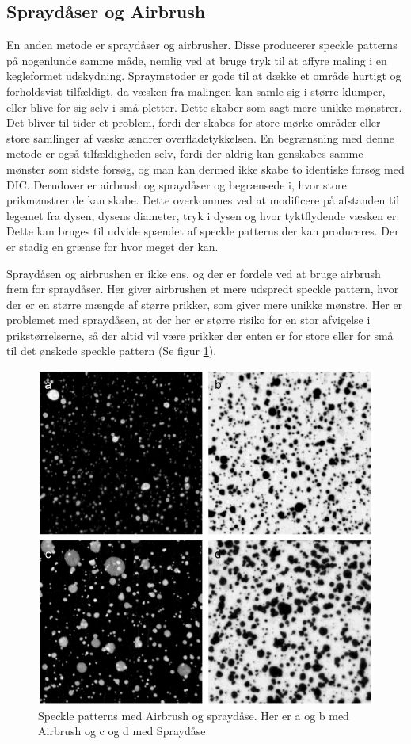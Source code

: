 \subsection{Spraydåser og Airbrush} En anden metode er spraydåser og airbrusher. Disse producerer speckle patterns på nogenlunde samme måde, nemlig ved at bruge tryk til at affyre maling i en kegleformet udskydning. Spraymetoder er gode til at dække et område hurtigt og forholdsvist tilfældigt, da væsken fra malingen kan samle sig i større klumper, eller blive for sig selv i små pletter. Dette skaber som sagt mere unikke mønstrer. Det bliver til tider et problem, fordi der skabes for store mørke områder eller store samlinger af væske ændrer overfladetykkelsen. En begrænsning med denne metode er også tilfældigheden selv, fordi der aldrig kan genskabes samme mønster som sidste forsøg, og man kan dermed ikke skabe to identiske forsøg med DIC. Derudover er airbrush og spraydåser og begrænsede i, hvor store prikmønstrer de kan skabe. Dette overkommes ved at modificere på afstanden til legemet fra dysen, dysens diameter, tryk i dysen og hvor tyktflydende væsken er. Dette kan bruges til udvide spændet af speckle patterns der kan produceres. Der er stadig en grænse for hvor meget der kan. \parencite{Dong2017ACorrelation, Quino2021SpeckleEndurance}

Spraydåsen og airbrushen er ikke ens, og der er fordele ved at bruge airbrush frem for spraydåser. Her giver airbrushen et mere udspredt speckle pattern, hvor der er en større mængde af større prikker, som giver mere unikke mønstre. Her er problemet med spraydåsen, at der her er større risiko for en stor afvigelse i prikstørrelserne, så der altid vil være prikker der enten er for store eller for små til det ønskede speckle pattern (Se figur \ref{Spraymetode}).\parencite{Crammond2013SpeckleCorrelation}
\begin{figure}[H]
    \centering
    \includegraphics[width=0.5\linewidth]{Sections/2 Problemanalyse/Media/AirvsSpray.png}
    \caption{Speckle patterns med Airbrush og spraydåse. Her er a og b med Airbrush og c og d med Spraydåse \parencite{Crammond2013SpeckleCorrelation}}
    \label{Spraymetode}
\end{figure}

